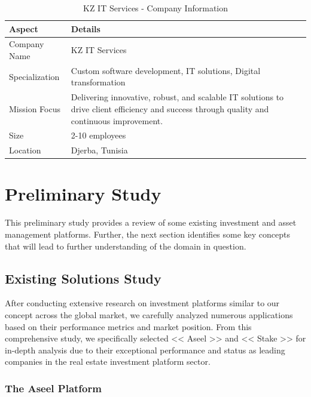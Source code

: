 \begin{table}[htbp]
    \centering
    \caption{KZ IT Services - Company Information}
    \label{tab:kz_it_services_info}
    \renewcommand{\arraystretch}{1.3}
    \begin{tabular}{|l|p{}|}
        \hline
        \rowcolor{primary!10}
        \textbf{Aspect} & \textbf{Details} \\
        \hline
        Company Name & KZ IT Services \\
        \hline
        \rowcolor{background!50}
        Specialization & Custom software development, IT solutions, Digital transformation \\
        \hline
        Mission Focus & Delivering innovative, robust, and scalable IT solutions to drive client efficiency and success through quality and continuous improvement. \\
        \hline
        \rowcolor{background!50}
        Size & 2-10 employees \\
        \hline
        \rowcolor{background!50}
        Location & Djerba, Tunisia \\
        \hline
    \end{tabular}
\end{table}


\section{Preliminary Study}

This preliminary study provides a review of some existing investment and asset management platforms. Further, the next section identifies some key concepts that will lead to further understanding of the domain in question.

\subsection{Existing Solutions Study}

After conducting extensive research on investment platforms similar to our concept across the global market, we carefully analyzed numerous applications based on their performance metrics and market position. From this comprehensive study, we specifically selected << Aseel >> and << Stake >> for in-depth analysis due to their exceptional performance and status as leading companies in the real estate investment platform sector.

\subsubsection{The Aseel Platform}

